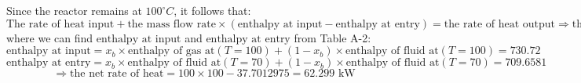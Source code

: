 Since the reactor remains at \(100^\circ C\), it follows that:
\[
\text{The rate of heat input} + \text{the mass flow rate} \times (\text{enthalpy at input} - \text{enthalpy at entry}) = \text{the rate of heat output} \Rightarrow \text{the net rate of heat} = \text{heat input rate} - \text{the mass flow rate} \times (\text{enthalpy at output} - \text{enthalpy at entry})
\]
where we can find \(\text{enthalpy at input}\) and \(\text{enthalpy at entry}\) from Table A-2:
\[
\text{enthalpy at input} = x_b \times \text{enthalpy of gas at} (T = 100) + (1 - x_b) \times \text{enthalpy of fluid at} (T = 100) = 730.72
\]
\[
\text{enthalpy at entry} = x_b \times \text{enthalpy of fluid at} (T = 70) + (1 - x_b) \times \text{enthalpy of fluid at} (T = 70) = 709.6581
\]
\[
\Rightarrow \text{the net rate of heat} = 100 \times 100 - 37.7012975 = \boxed{62.299 \text{ kW}}
\]